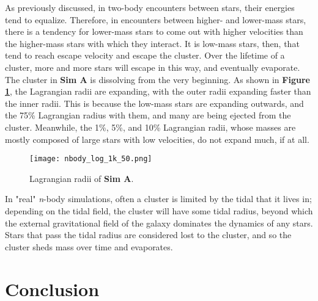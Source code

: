 \documentclass{article}
\begin{document}
As previously discussed, in two-body encounters between stars, their energies tend to equalize. Therefore, in encounters between higher- and lower-mass stars, there is a tendency for lower-mass stars to come out with higher velocities than the higher-mass stars with which they interact. It is low-mass stars, then, that tend to reach escape velocity and escape the cluster. Over the lifetime of a cluster, more and more stars will escape in this way, and eventually evaporate. The cluster in \textbf{Sim A} is dissolving from the very beginning. As shown in \textbf{Figure \ref{nbody_log_1k_50}}, the Lagrangian radii are expanding, with the outer radii expanding faster than the inner radii. This is because the low-mass stars are expanding outwards, and the 75\% Lagrangian radius with them, and many are being ejected from the cluster. Meanwhile, the 1\%, 5\%, and 10\% Lagrangian radii, whose masses are mostly composed of large stars with low velocities, do not expand much, if at all.
\begin{figure}
\centering
    \texttt{[image: nbody\_log\_1k\_50.png]}
    \linespread{1}
    \caption{Lagrangian radii of \textbf{Sim A}.}
    \label{nbody_log_1k_50}
\end{figure}
\linespread{1}

In "real" \textit{n}-body simulations, often a cluster is limited by the tidal that it lives in; depending on the tidal field, the cluster will have some tidal radius, beyond which the external gravitational field of the galaxy dominates the dynamics of any stars. Stars that pass the tidal radius are considered lost to the cluster, and so the cluster sheds mass over time and evaporates.

\section{Conclusion}
\end{document}
